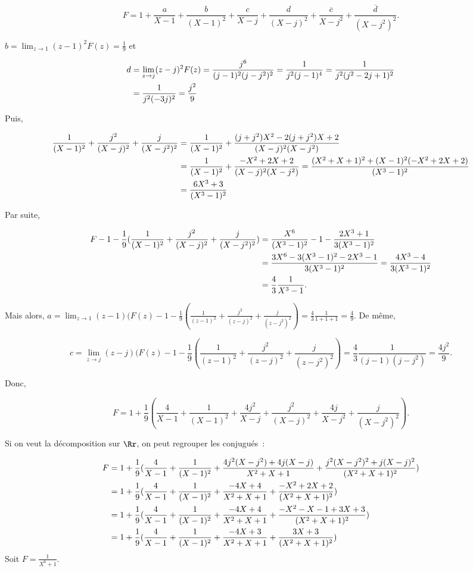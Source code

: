 {{$$F=1+\frac{a}{X-1}+\frac{b}{(X-1)^2}+\frac{c}{X-j}+\frac{d}{(X-j)^2}+\frac{\overline{c}}{X-j^2}+\frac{\overline{d}}{(X-j^2)^2}.$$

$b=\lim_{z\rightarrow 1}(z-1)^2F(z)=\frac{1}{9}$ et 

\begin{align*}\ensuremath
d&=\lim_{z\rightarrow j}(z-j)^2F(z)=\frac{j^6}{(j-1)^2(j-j^2)^2}=\frac{1}{j^2(j-1)^4}=\frac{1}{j^2(j^2-2j+1)^2}\\
 &= \frac{1}{j^2(-3j)^2}=\frac{j^2}{9}
\end{align*}

Puis,

\begin{align*}\ensuremath
\frac{1}{(X-1)^2}+\frac{j^2}{(X-j)^2}+\frac{j}{(X-j^2)^2}&=\frac{1}{(X-1)^2}+\frac{(j+j^2)X^2-2(j+j^2)X+2}{(X-j)^2(X-j^2)}\\
 &=\frac{1}{(X-1)^2}+\frac{-X^2+2X+2}{(X-j)^2(X-j^2)}=\frac{(X^2+X+1)^2+(X-1)^2(-X^2+2X+2)}{(X^3-1)^2}\\
 &=\frac{6X^3+3}{(X^3-1)^2}
\end{align*}

Par suite,

\begin{align*}\ensuremath
F-1-\frac{1}{9}( \frac{1}{(X-1)^2}+\frac{j^2}{(X-j)^2}+\frac{j}{(X-j^2)^2})&=\frac{X^6}{(X^3-1)^2}-1-\frac{2X^3+1}{3(X^3-1)^2}\\
 &=\frac{3X^6-3(X^3-1)^2-2X^3-1}{3(X^3-1)^2}=\frac{4X^3-4}{3(X^3-1)^2}\\
 &=\frac{4}{3}\frac{1}{X^3-1}.
\end{align*}

Mais alors, $a=\lim_{z\rightarrow 1}(z-1)(F(z)-1-\frac{1}{9}(\frac{1}{(z-1)^2}+\frac{j^2}{(z-j)^2}+\frac{j}{(z-j^2)^2})
=\frac{4}{3}\frac{1}{1+1+1}=\frac{4}{9}$. De même,

$$c=\lim_{z\rightarrow j}(z-j)(F(z)-1-\frac{1}{9}(\frac{1}{(z-1)^2}+\frac{j^2}{(z-j)^2}+\frac{j}{(z-j^2)^2})
=\frac{4}{3}\frac{1}{(j-1)(j-j^2)}=\frac{4j^2}{9}.$$
  
Donc,

$$F=1+\frac{1}{9}(\frac{4}{X-1}+\frac{1}{(X-1)^2}+\frac{4j^2}{X-j}+\frac{j^2}{(X-j)^2}+\frac{4j}{X-j^2}+\frac{j}{(X-j^2)^2}).$$

Si on veut la décomposition sur $\Rr$, on peut regrouper les conjugués~:

\begin{align*}\ensuremath
F&=1+\frac{1}{9}(\frac{4}{X-1}+\frac{1}{(X-1)^2}+\frac{4j^2(X-j^2)+4j(X-j)}
{X^2+X+1}+\frac{j^2(X-j^2)^2+j(X-j)^2}{(X^2+X+1)^2})\\
 &=1+\frac{1}{9}(\frac{4}{X-1}+\frac{1}{(X-1)^2}+\frac{-4X+4}{X^2+X+1}+\frac{-X^2+2X+2}{(X^2+X+1)^2})\\
 &=1+\frac{1}{9}(\frac{4}{X-1}+\frac{1}{(X-1)^2}+\frac{-4X+4}{X^2+X+1}+\frac{-X^2-X-1+3X+3}{(X^2+X+1)^2})\\
 &=1+\frac{1}{9}(\frac{4}{X-1}+\frac{1}{(X-1)^2}+\frac{-4X+3}{X^2+X+1}+\frac{3X+3}{(X^2+X+1)^2})
\end{align*}
Soit $F=\frac{1}{X^6+1}$. 

}}
